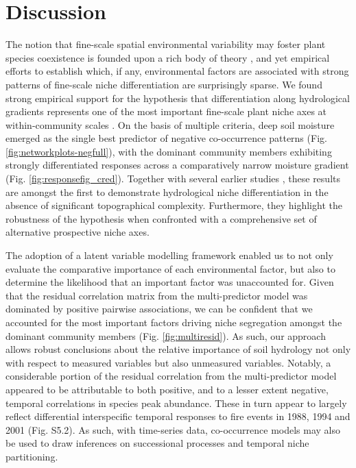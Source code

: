 \section{Discussion}

The notion that fine-scale spatial environmental variability may foster plant species coexistence is founded upon a rich body of theory \citep{Chesson2000, Amarasekare2003, Adler2013}, and yet empirical efforts to establish which, if any, environmental factors are associated with strong patterns of fine-scale niche differentiation are surprisingly sparse. We found strong empirical support for the hypothesis that differentiation along hydrological gradients represents one of the most important fine-scale plant niche axes at within-community scales \citep[\textit{sensu}][]{Silvertown2015}. On the basis of multiple criteria, deep soil moisture emerged as the single best predictor of negative co-occurrence patterns (Fig. \ref{fig:networkplots-negfull}), with the dominant community members exhibiting strongly differentiated responses across a comparatively narrow moisture gradient (Fig. \ref{fig:responsefig_cred}). Together with several earlier studies \citep[e.g.][]{Silvertown1999, Araya2011}, these results are amongst the first to demonstrate hydrological niche differentiation in the absence of significant topographical complexity. Furthermore, they highlight the robustness of the hypothesis when confronted with a comprehensive set of alternative prospective niche axes.

The adoption of a latent variable modelling framework enabled us to not only evaluate the comparative importance of each environmental factor, but also to determine the likelihood that an important factor was unaccounted for. Given that the residual correlation matrix from the multi-predictor model was dominated by positive pairwise associations, we can be confident that we accounted for the most important factors driving niche segregation amongst the dominant community members (Fig. \ref{fig:multiresid}). As such, our approach allows robust conclusions about the relative importance of soil hydrology not only with respect to measured variables but also unmeasured variables. Notably, a considerable portion of the residual correlation from the multi-predictor model appeared to be attributable to both positive, and to a lesser extent negative, temporal correlations in species peak abundance. These in turn appear to largely reflect differential interspecific temporal responses to fire events in 1988, 1994 and 2001 (Fig. S5.2). As such, with time-series data, co-occurrence models may also be used to draw inferences on successional processes and temporal niche partitioning. 

